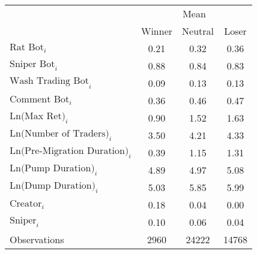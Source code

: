 \begin{tabular}{lccc}
\toprule
& \multicolumn{3}{c}{Mean} \\
\cmidrule{2-4}
& Winner & Neutral & Loser \\
\midrule
$\text{Rat Bot}_{i}$ & 0.21 & 0.32 & 0.36 \\
$\text{Sniper Bot}_{i}$ & 0.88 & 0.84 & 0.83 \\
$\text{Wash Trading Bot}_{i}$ & 0.09 & 0.13 & 0.13 \\
$\text{Comment Bot}_{i}$ & 0.36 & 0.46 & 0.47 \\
$\text{Ln(Max Ret)}_{i}$ & 0.90 & 1.52 & 1.63 \\
$\text{Ln(Number of Traders)}_{i}$ & 3.50 & 4.21 & 4.33 \\
$\text{Ln(Pre-Migration Duration)}_{i}$ & 0.39 & 1.15 & 1.31 \\
$\text{Ln(Pump Duration)}_{i}$ & 4.89 & 4.97 & 5.08 \\
$\text{Ln(Dump Duration)}_{i}$ & 5.03 & 5.85 & 5.99 \\
$\text{Creator}_{i}$ & 0.18 & 0.04 & 0.00 \\
$\text{Sniper}_{i}$ & 0.10 & 0.06 & 0.04 \\
\midrule
Observations & 2960 & 24222 & 14768 \\
\bottomrule
\end{tabular}